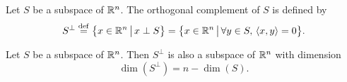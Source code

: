 \documentclass[11pt,nocut]{article}
\begin{document}
\begin{definition}
	Let $S$ be a subspace of $\mathbb{R}^n$. The orthogonal complement of $S$ is defined by
	$$
	S^{\perp} \overset{\rm def}{=} 
	\big\{ x \in \mathbb{R}^n \, \big| \, x \perp S \big\} = 
	\big\{ x \in \mathbb{R}^n \, \big| \, \forall y \in S, \, \langle x,y \rangle = 0 \big\}.
	$$
\end{definition}

\begin{proposition}
	Let $S$ be a subspace of $\mathbb{R}^n$. Then $S^{\perp}$ is also a subspace of $\mathbb{R}^n$ with dimension
	$$
	\dim(S^{\perp}) = n - \dim(S).
	$$
\end{proposition}

\vspace{1cm}
\centerline{}

%
%
\end{document}
